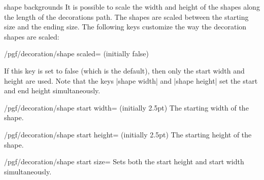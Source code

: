\begin{decoration}{shape backgrounds}
    It is possible to scale the width and height of the shapes along the length
    of the decorations path. The shapes are scaled between the starting size
    and the ending size. The following keys customize the way the decoration
    shapes are scaled:

    \begin{key}{/pgf/decoration/shape scaled= (initially false)}
\begin{codeexample}[preamble={\usetikzlibrary{decorations.shapes}}]
\end{codeexample}

        If this key is set to false (which is the default), then only the start
        width and height are used. Note that the keys |shape width| and
        |shape height| set the start and end height simultaneously.
    \end{key}

    \begin{key}{/pgf/decoration/shape start width= (initially 2.5pt)}
        The starting width of the shape.
    \end{key}%

    \begin{key}{/pgf/decoration/shape start height= (initially 2.5pt)}
        The starting height of the shape.
    \end{key}%

    \begin{stylekey}{/pgf/decoration/shape start size=}
        Sets both the start height and start width simultaneously.
    \end{stylekey}%


\end{decoration}
